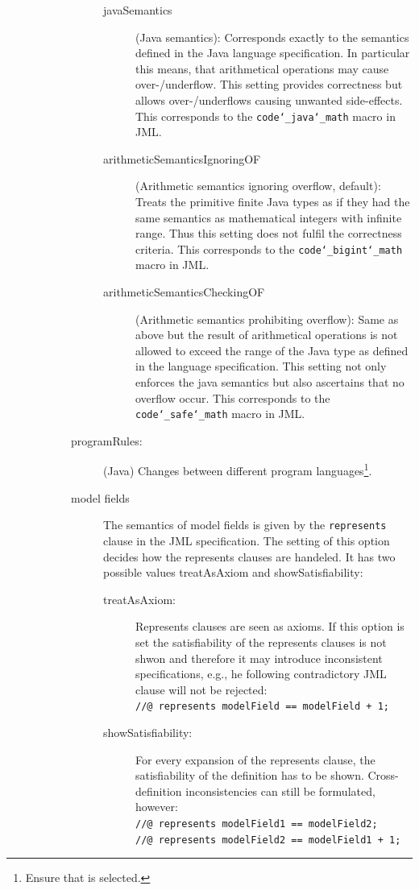 \begin{description}
\begin{description}
\begin{description}
      \begin{description}
      \item[\textsf{javaSemantics}] (Java semantics): Corresponds
        exactly to the semantics defined in the Java language
        specification. In particular this means, that arithmetical
        operations may cause over-/underflow. This setting provides
        correctness but allows over-/underflows causing unwanted
        side-effects.
	This corresponds to the \texttt{code\char`\_java\char`\_math}
	macro in JML.
      \item[\textsf{arithmeticSemanticsIgnoringOF}] (Arithmetic
        semantics ignoring overflow, default): Treats the primitive
        finite Java types as if they had the same semantics as
        mathematical integers with infinite range. Thus this setting
        does not fulfil the correctness criteria.
	This corresponds to the \texttt{code\char`\_bigint\char`\_math}
	macro in JML.
      \item[\textsf{arithmeticSemanticsCheckingOF}] (Arithmetic
        semantics prohibiting overflow): Same as above but the result
        of arithmetical operations is not allowed to exceed the range
        of the Java type as defined in the language
        specification. This setting not only enforces the java
        semantics but also ascertains that no overflow occur.
	This corresponds to the \texttt{code\char`\_safe\char`\_math}
	macro in JML.
      \end{description}

    \item[programRules:] (\textsf{Java}) Changes between different
      program languages\footnote{Ensure that  is selected.}.

     \item[model fields] The semantics of model fields is given by 
     the \texttt{represents} clause in the JML specification. 
     The setting of this option decides how the represents clauses are handeled.
     It has two possible values \textsf{treatAsAxiom} 
     and \textsf{showSatisfiability}:
     \begin{description}
      \item[treatAsAxiom:] Represents clauses are seen as axioms. 
      If this option is set the satisfiability of the represents 
      clauses is not shwon and therefore it may introduce inconsistent
      specifications, e.g., he following contradictory JML clause
      will not be rejected:\\
      \texttt{//@ represents modelField == modelField + 1;}
      \item[showSatisfiability:] For every expansion of the represents 
      clause, the satisfiability of the definition has to be shown.
      Cross-definition inconsistencies can still be
      formulated, however:\\
	\texttt{//@ represents modelField1 == modelField2;}\\
	 \texttt{//@ represents modelField2 == modelField1 + 1;}
     \end{description}



\end{description}
\end{description}
\end{description}
